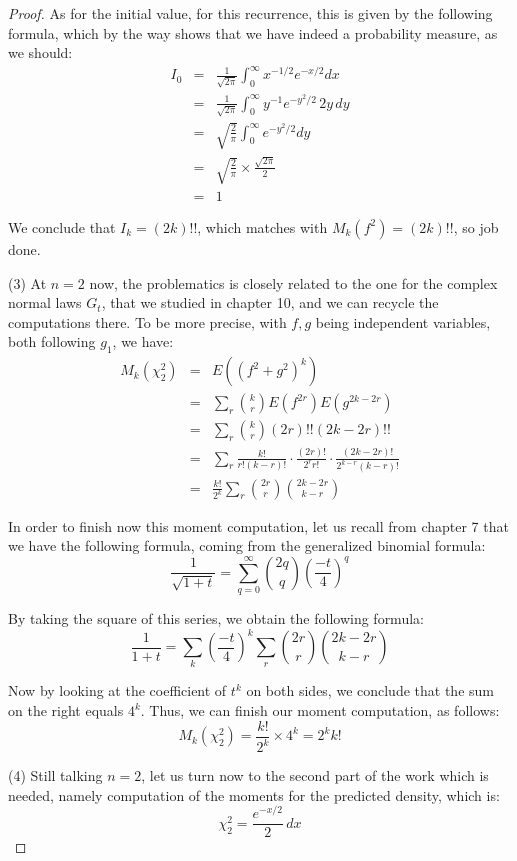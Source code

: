 \documentclass[10pt,a4paper]{amsart}
\begin{document}
\begin{proof}
As for the initial value, for this recurrence, this is given by the following formula, which by the way shows that we have indeed a probability measure, as we should:
\begin{eqnarray*}
I_0
&=&\frac{1}{\sqrt{2\pi}}\int_0^\infty x^{-1/2}e^{-x/2}dx\\
&=&\frac{1}{\sqrt{2\pi}}\int_0^\infty y^{-1}e^{-y^2/2}\,2y\,dy\\
&=&\sqrt{\frac{2}{\pi}}\int_0^\infty e^{-y^2/2}dy\\
&=&\sqrt{\frac{2}{\pi}}\times\frac{\sqrt{2\pi}}{2}\\
&=&1
\end{eqnarray*}

We conclude that $I_k=(2k)!!$, which matches with $M_k(f^2)=(2k)!!$, so job done.

\medskip

(3) At $n=2$ now, the problematics is closely related to the one for the complex normal laws $G_t$, that we studied in chapter 10, and we can recycle the computations there. To be more precise, with $f,g$ being independent variables, both following $g_1$, we have:
\begin{eqnarray*}
M_k(\chi_2^2)
&=&E((f^2+g^2)^k)\\
&=&\sum_r\binom{k}{r}E(f^{2r})E(g^{2k-2r})\\
&=&\sum_r\binom{k}{r}(2r)!!(2k-2r)!!\\
&=&\sum_r\frac{k!}{r!(k-r)!}\cdot\frac{(2r)!}{2^rr!}\cdot\frac{(2k-2r)!}{2^{k-r}(k-r)!}\\
&=&\frac{k!}{2^k}\sum_r\binom{2r}{r}\binom{2k-2r}{k-r}
\end{eqnarray*}

In order to finish now this moment computation, let us recall from chapter 7 that we have the following formula, coming from the generalized binomial formula:
$$\frac{1}{\sqrt{1+t}}=\sum_{q=0}^\infty\binom{2q}{q}\left(\frac{-t}{4}\right)^q$$

By taking the square of this series, we obtain the following formula:
$$\frac{1}{1+t}
=\sum_k\left(\frac{-t}{4}\right)^k\sum_r\binom{2r}{r}\binom{2k-2r}{k-r}$$

Now by looking at the coefficient of $t^k$ on both sides, we conclude that the sum on the right equals $4^k$. Thus, we can finish our moment computation, as follows:
$$M_k(\chi_2^2)=\frac{k!}{2^k}\times 4^k=2^kk!$$

(4) Still talking $n=2$, let us turn now to the second part of the work which is needed, namely computation of the moments for the predicted density, which is:
$$\chi_2^2=\frac{e^{-x/2}}{2}\,dx$$


\end{proof}
\end{document}

